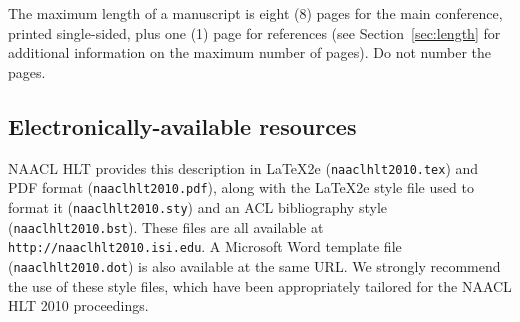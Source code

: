 \documentclass[11pt,letterpaper]{article}
\begin{document}
The maximum length of a manuscript is eight (8) pages for the main
conference, printed single-sided, plus one (1) page for references
(see Section~\ref{sec:length} for additional information on the
maximum number of pages).  Do not number the pages.

\subsection{Electronically-available resources}

NAACL HLT provides this description in \LaTeX2e{} ({\tt naaclhlt2010.tex}) and PDF
format ({\tt naaclhlt2010.pdf}), along with the \LaTeX2e{} style file used to
format it ({\tt naaclhlt2010.sty}) and an ACL bibliography style ({\tt naaclhlt2010.bst}).
These files are all available at
{\tt http://naaclhlt2010.isi.edu}.  A Microsoft Word
template file ({\tt naaclhlt2010.dot}) is also available at the same URL. We
strongly recommend the use of these style files, which have been
appropriately tailored for the NAACL HLT 2010 proceedings.
\end{document}
